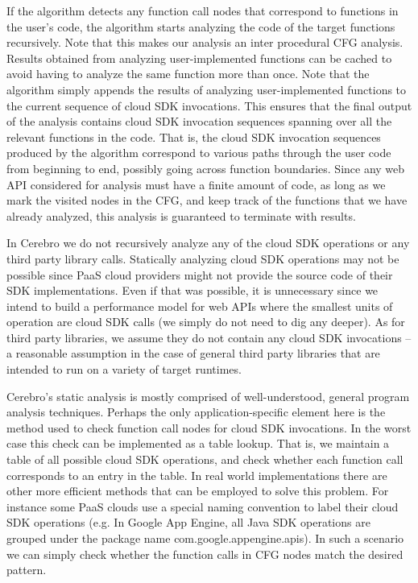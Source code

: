 If the algorithm detects any function call nodes that correspond to functions in the user's code, the algorithm
starts analyzing the code of the target functions recursively. Note that this makes our analysis an inter procedural
CFG analysis. Results obtained from analyzing user-implemented functions can be cached to avoid
having to analyze the same function more than once. Note that the algorithm simply appends the results of
analyzing user-implemented functions to the current sequence of cloud SDK invocations. This ensures that the final output of the
analysis contains cloud SDK invocation sequences spanning over all the relevant functions in the code. That is, the cloud SDK invocation sequences
produced by the algorithm correspond to various paths through the user code from beginning to end, possibly
going across function boundaries. Since any web API considered for analysis must have a finite amount of code, as long as
we mark the visited nodes in the CFG, and keep track of the functions that we have already analyzed, this
analysis is guaranteed to terminate with results.

In Cerebro we do not recursively analyze any of the cloud
SDK operations or any third party library calls. Statically analyzing cloud SDK operations may not be
possible since PaaS cloud providers might not provide the source code of their SDK implementations.
Even if that was possible, it is unnecessary since we intend to build a performance model for web APIs where
the smallest units of operation are cloud SDK calls (we simply do not need to dig any deeper). As for third 
party libraries, we assume they do not contain any cloud SDK invocations -- a reasonable assumption 
in the case of general third party libraries that are intended to run on a variety of target runtimes. 
 
Cerebro's static analysis is mostly comprised of well-understood, general program analysis techniques.
 Perhaps the only application-specific element here is the method used to check function call nodes for cloud SDK invocations.
 In the worst case this check can be implemented as a table lookup. That is, we maintain a table of all possible cloud
 SDK operations, and check whether each function call
 corresponds to an entry in the table. In real world implementations there are other more efficient methods that
 can be employed to solve this problem. For instance some PaaS clouds use a special naming convention to label
 their cloud SDK operations (e.g. In Google App Engine, all Java SDK operations are grouped under the package name
 com.google.appengine.apis). In such a scenario we can simply check whether the function calls in CFG nodes match the
 desired pattern. 
 
